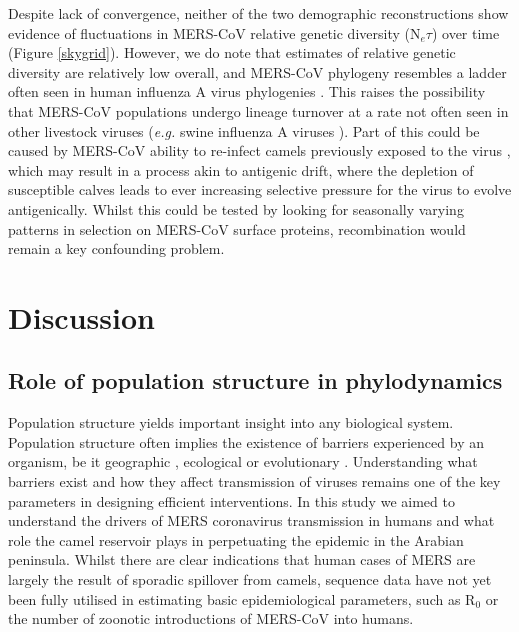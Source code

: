\documentclass[11pt,oneside,letterpaper]{article}
\begin{document}
Despite lack of convergence, neither of the two demographic reconstructions show evidence of fluctuations in MERS-CoV relative genetic diversity (N$_{e}\tau$) over time (Figure \ref{skygrid}).
However, we do note that estimates of relative genetic diversity are relatively low overall, and MERS-CoV phylogeny resembles a ladder often seen in human influenza A virus phylogenies \citep{bedford_strength_2011}.
This raises the possibility that MERS-CoV populations undergo lineage turnover at a rate not often seen in other livestock viruses (\textit{e.g.} swine influenza A viruses \citep{vijaykrishna_long-term_2011}).
Part of this could be caused by MERS-CoV ability to re-infect camels previously exposed to the virus \citep{ali_systematic_2017}, which may result in a process akin to antigenic drift, where the depletion of susceptible calves leads to ever increasing selective pressure for the virus to evolve antigenically.
Whilst this could be tested by looking for seasonally varying patterns in selection on MERS-CoV surface proteins, recombination would remain a key confounding problem.



\section*{Discussion}

\subsection*{Role of population structure in phylodynamics}
Population structure yields important insight into any biological system.
Population structure often implies the existence of barriers experienced by an organism, be it geographic \citep{dudas_virus_2017}, ecological \citep{smith_dating_2009} or evolutionary \citep{turner_genomic_2005,dudas_reassortment_2015}.
Understanding what barriers exist and how they affect transmission of viruses remains one of the key parameters in designing efficient interventions.
In this study we aimed to understand the drivers of MERS coronavirus transmission in humans and what role the camel reservoir plays in perpetuating the epidemic in the Arabian peninsula.
Whilst there are clear indications that human cases of MERS are largely the result of sporadic spillover from camels, sequence data have not yet been fully utilised in estimating basic epidemiological parameters, such as R$_{0}$ or the number of zoonotic introductions of MERS-CoV into humans.
\end{document}
